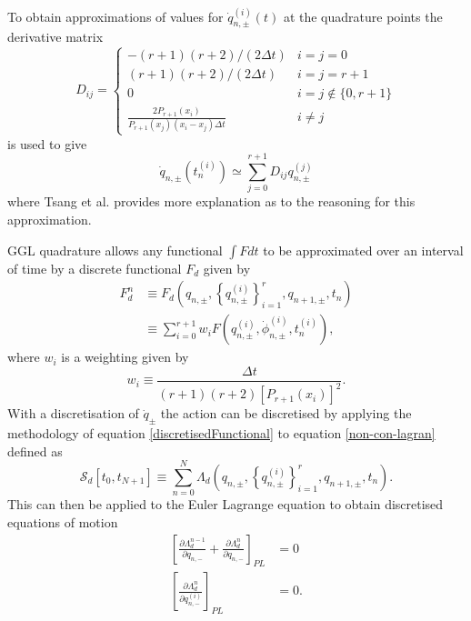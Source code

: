 \documentclass[10pt]{iopart}
\begin{document}
To obtain approximations of values for $\dot{q}_{n,\pm}^{(i)}(t)$ at the quadrature points the derivative matrix \cite{Boyd}
\begin{equation}
	D_{ij} = 
	\begin{cases}
		-(r+1)(r+2)/(2\Delta t) &i=j=0 \\
		(r+1)(r+2)/(2\Delta t) &i=j=r+1 \\
		0 &i=j\notin\{0,r+1\} \\
		\frac{2P_{r+1}(x_i)}{P_{r+1}(x_j)(x_i-x_j)\Delta t} &i\neq j
	\end{cases}
\end{equation}
is used to give
\begin{equation}
	\dot{q}_{n,\pm}(t_n^{(i)}) \simeq \sum_{j=0}^{r+1} D_{ij}q_{n,\pm}^{(j)}
\end{equation}
where Tsang et al. \cite{Tsang_Slimplectic} provides more explanation as to the reasoning for this approximation.

GGL quadrature allows any functional $\int F dt$ to be approximated over an interval of time by a discrete functional $F_d$ given by
\begin{equation}
\label{discretisedFunctional}
\begin{aligned}
F_d^n &\equiv F_d\left(q_{n, \pm},\left\{q_{n, \pm}^{(i)}\right\}_{i=1}^r, q_{n+1, \pm}, t_n\right) \\  &\equiv \sum_{i=0}^{r+1} w_i F\left(q_{n, \pm}^{(i)}, \dot{\phi}_{n, \pm}^{(i)}, t_n^{(i)}\right),
\end{aligned}
\end{equation}
where $w_i$ is a weighting given by 
\begin{equation}
	w_i \equiv \frac{\Delta t}{(r+1)(r+2)[P_{r+1}(x_i)]^2}.
\end{equation}
With a discretisation of $\dot{q}_{\pm}$ the action can be discretised by applying the methodology of equation \ref{discretisedFunctional} to equation \ref{non-con-lagran} defined as 
\begin{equation}
\mathcal{S}_d\left[t_0, t_{N+1}\right] \equiv \sum_{n=0}^N \Lambda_d\left(q_{n, \pm},\left\{q_{n, \pm}^{(i)}\right\}_{i=1}^r, q_{n+1, \pm}, t_n\right).
\end{equation}
This can then be applied to the Euler Lagrange equation to obtain discretised equations of motion
\begin{subequations}
\label{positionEoM}
\begin{align}
		\left[\frac{\partial \Lambda_d^{n-1}}{\partial q_{n,-}} + \frac{\partial\Lambda_d^n}{\partial q_{n,-}}\right]_{PL} &= 0 \\
	\left[\frac{\partial\Lambda_d^n}{\partial q_{n,-}^{(i)}}\right]_{PL} &= 0.
\end{align}
\end{subequations}
\end{document}
